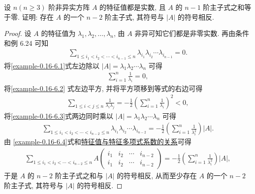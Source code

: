 \documentclass[../../main.tex]{subfiles}
\begin{document}
\begin{example}
设 $n (n \geqslant  3)$ 阶非异实方阵 $A$ 的特征值都是实数, 且 $A$ 的 $n-1$ 阶主子式之和等于零. 证明: 存在 $A$ 的一个 $n-2$ 阶主子式, 其符号与 $|A|$ 的符号相反.
\end{example}
\begin{proof}
设 $A$ 的特征值为 $\lambda_1, \lambda_2, \dots, \lambda_n$, 由 $A$ 非异可知它们都是非零实数. 再由条件和例 6.24 可知
\begin{align}
\sum_{1 \leqslant  i_1 < i_2 < \cdots < i_{n-1} \leqslant  n} \lambda_{i_1} \lambda_{i_2} \cdots \lambda_{i_{n-1}} = 0.\label{example-0.16-6.1}
\end{align}
将\eqref{example-0.16-6.1}式左边除以 $|A| = \lambda_1 \lambda_2 \cdots \lambda_n$ 可得
\begin{align}
\sum_{i=1}^n \frac{1}{\lambda_i} = 0, \label{example-0.16-6.2}
\end{align}
将\eqref{example-0.16-6.2} 式左边平方, 并将平方项移到等式的右边可得
\begin{align}
\sum_{1 \leqslant  i < j \leqslant  n} \frac{1}{\lambda_i \lambda_j} = -\frac{1}{2} \left( \sum_{i=1}^n \frac{1}{\lambda_i} \right)^2 < 0, \label{example-0.16-6.3}
\end{align}
将\eqref{example-0.16-6.3}式两边同时乘以 $|A| = \lambda_1 \lambda_2 \cdots \lambda_n$ 可得
\begin{align}
\sum_{1 \leqslant  i_1 < i_2 < \cdots < i_{n-2} \leqslant  n} \lambda_{i_1} \lambda_{i_2} \cdots \lambda_{i_{n-2}} = -\frac{1}{2} \left( \sum_{i=1}^n \frac{1}{\lambda_i^2} \right) |A|. \label{example-0.16-6.4}
\end{align}
由 \eqref{example-0.16-6.4}式和\hyperref[proposition:特征值与特征多项式系数的关系]{特征值与特征多项式系数的关系}可得
\begin{align*}
\sum_{1 \leqslant  i_1 < i_2 < \cdots < i_{n-2} \leqslant  n} A \begin{pmatrix}
i_1 & i_2 & \cdots & i_{n-2} \\
i_1 & i_2 & \cdots & i_{n-2}
\end{pmatrix} = -\frac{1}{2} \left( \sum_{i=1}^n \frac{1}{\lambda_i^2} \right) |A|,
\end{align*}
于是 $A$ 的 $n-2$ 阶主子式之和与 $|A|$ 的符号相反, 从而至少存在 $A$ 的一个 $n-2$ 阶主子式, 其符号与 $|A|$ 的符号相反. 

\end{proof}
\end{document}
